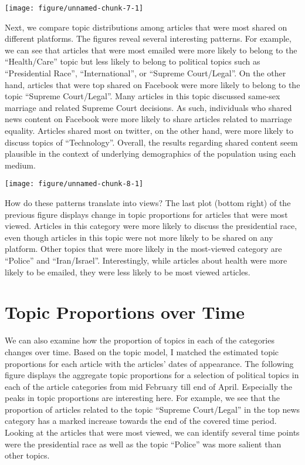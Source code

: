 \documentclass[12pt]{article}
\begin{document}
\begin{doublespace}
\begin{knitrout}
\color{fgcolor}
\texttt{[image: figure/unnamed-chunk-7-1]} 

\end{knitrout}


Next, we compare topic distributions among articles that were most shared on different platforms. The figures reveal several interesting patterns. For example, we can see that articles that were most emailed were more likely to belong to the ``Health/Care'' topic but less likely to belong to political topics such as ``Presidential Race'', ``International'', or ``Supreme Court/Legal''. On the other hand, articles that were top shared on Facebook were more likely to belong to the topic ``Supreme Court/Legal''. Many articles in this topic discussed same-sex marriage and related Supreme Court decisions. As such, individuals who shared news content on Facebook were more likely to share articles related to marriage equality. Articles shared most on twitter, on the other hand, were more likely to discuss topics of ``Technology''. Overall, the results regarding shared content seem plausible in the context of underlying demographics of the population using each medium.

\begin{knitrout}
\color{fgcolor}
\texttt{[image: figure/unnamed-chunk-8-1]} 

\end{knitrout}

How do these patterns translate into views? The last plot (bottom right) of the previous figure displays change in topic proportions for articles that were most viewed. Articles in this category were more likely to discuss the presidential race, even though articles in this topic were not more likely to be shared on any platform. Other topics that were more likely in the most-viewed category are ``Police'' and ``Iran/Israel''. Interestingly, while articles about health were more likely to be emailed, they were less likely to be most viewed articles.


\section{Topic Proportions over Time}

We can also examine how the proportion of topics in each of the categories changes over time. Based on the topic model, I matched the estimated topic proportions for each article with the articles' dates of appearance. The following figure displays the aggregate topic proportions for a selection of political topics in each of the article categories from mid February till end of April. Especially the peaks in topic proportions are interesting here. For example, we see that the proportion of articles related to the topic ``Supreme Court/Legal'' in the top news category has a marked increase towards the end of the covered time period. Looking at the articles that were most viewed, we can identify several time points were the presidential race as well as the topic ``Police'' was more salient than other topics.



\end{doublespace}
\end{document}
